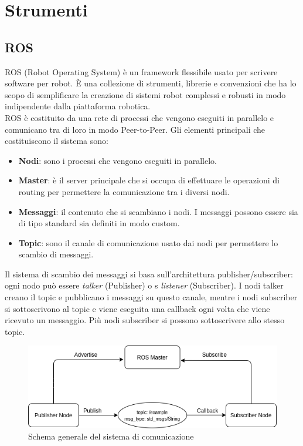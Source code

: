 \chapter{Strumenti}

\section{ROS}

ROS (Robot Operating System) è un framework flessibile usato per scrivere software per robot.
È una collezione di strumenti, librerie e convenzioni che ha lo scopo di semplificare la creazione di sistemi robot complessi e robusti in modo indipendente dalla piattaforma robotica. \\
ROS è costituito da una rete di processi che vengono eseguiti in parallelo e comunicano tra di loro in modo Peer-to-Peer.
Gli elementi principali che costituiscono il sistema sono:
\begin{itemize}
  \item \textbf{Nodi}: sono i processi che vengono eseguiti in parallelo.
  \item \textbf{Master}: è il server principale che si occupa di effettuare le operazioni di routing per permettere la comunicazione tra i diversi nodi.
  \item \textbf{Messaggi}: il contenuto che si scambiano i nodi. I messaggi possono essere sia di tipo standard sia definiti in modo custom.
  \item \textbf{Topic}: sono il canale di comunicazione usato dai nodi per permettere lo scambio di messaggi.
\end{itemize}
Il sistema di scambio dei messaggi si basa sull'architettura publisher/subscriber: ogni nodo può essere \textit{talker} (Publisher) o s \textit{listener}  (Subscriber).
I nodi talker creano il topic e pubblicano i messaggi su questo canale, mentre i nodi subscriber si sottoscrivono al topic e viene eseguita una callback ogni volta che viene ricevuto un messaggio. Più nodi subscriber si possono sottoscrivere allo stesso topic.

\begin{figure}[H]
\centering
\includegraphics[scale=0.8]{images/ros_system.png}
\caption{Schema generale del sistema di comunicazione}
\end{figure}

